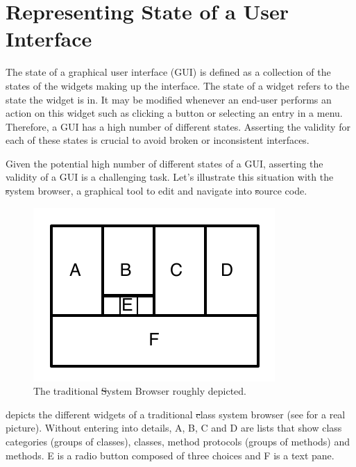 \documentclass[a4paper,10pt,twoside]{book}
\begin{document}
\section{Representing State of a User Interface} \label{sec:problem}

The state of a graphical user interface (GUI) is defined as a collection of the states of the widgets making up the interface. The state of a widget refers to the state the widget is in. It may be modified whenever an end-user performs an action on this widget such as clicking a button or selecting an entry in a menu. Therefore, a GUI has a high number of different states. Asserting the validity for each of these states is crucial to avoid broken or inconsistent interfaces.

Given the potential high number of different states of a GUI, asserting the validity of a GUI is a challenging task. Let's illustrate this situation with the \st system browser, a graphical tool to edit and navigate into \st source code.

\begin{figure}[!ht]
\begin{center}
\includegraphics[scale=0.65]{miniStBrowser}
\caption{The traditional \st System Browser roughly depicted.} 
\end{center}
\end{figure}


 depicts the different widgets of a traditional \st class system browser (see  for a real picture). Without entering into details, A, B, C and D are lists that show class categories (groups of classes), classes, method protocols (groups of methods) and methods. E is a radio button composed of three choices and F is a text pane. 
\end{document}
